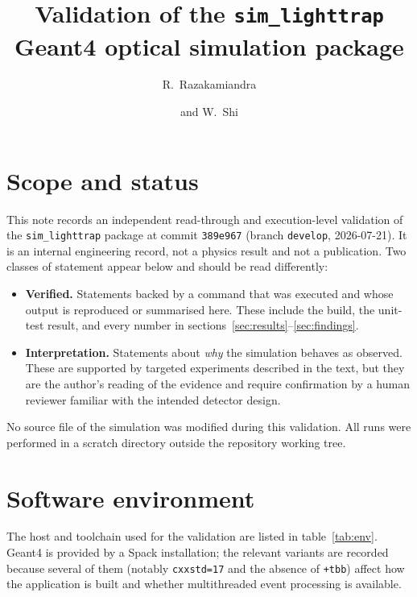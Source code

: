 \documentclass[a4paper,11pt]{article}
\title{\boldmath Validation of the \texttt{sim\_lighttrap} Geant4 optical
simulation package}
\author[a,1]{R.~Razakamiandra}
\author[a]{and W.~Shi}
\affiliation[a]{Department of Physics and Astronomy, Stony Brook University,\\
Stony Brook, NY 11794, USA}
\begin{document}
\maketitle
\flushbottom

\section{Scope and status}
\label{sec:scope}

This note records an independent read-through and execution-level validation of
the \texttt{sim\_lighttrap} package at commit \texttt{389e967} (branch
\texttt{develop}, 2026-07-21). It is an internal engineering record, not a
physics result and not a publication. Two classes of statement appear below and
should be read differently:

\begin{itemize}
\item \textbf{Verified.} Statements backed by a command that was executed and
whose output is reproduced or summarised here. These include the build, the
unit-test result, and every number in
sections~\ref{sec:results}--\ref{sec:findings}.
\item \textbf{Interpretation.} Statements about \emph{why} the simulation
behaves as observed. These are supported by targeted experiments described in
the text, but they are the author's reading of the evidence and require
confirmation by a human reviewer familiar with the intended detector design.
\end{itemize}

No source file of the simulation was modified during this validation. All runs
were performed in a scratch directory outside the repository working tree.

\section{Software environment}
\label{sec:env}

The host and toolchain used for the validation are listed in
table~\ref{tab:env}. Geant4 is provided by a Spack installation; the relevant
variants are recorded because several of them (notably \texttt{cxxstd=17} and
the absence of \texttt{+tbb}) affect how the application is built and whether
multithreaded event processing is available.
\end{document}

